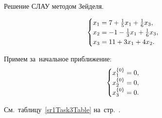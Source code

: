 \documentclass[10pt, a4paper, titlepage]{article}
\begin{document}
Решение СЛАУ методом Зейделя.

\begin{equation*}
    \begin{cases}
        $$x_1=7+\frac{1}{5}x_1+\frac{1}{6}x_3$$, \\
        $$x_2=-1-\frac{1}{3}x_1+\frac{1}{6}x_3$$, \\
        $$x_3=11+3x_1+4x_2$$.
    \end{cases}
\end{equation*}

Примем за~начальное приближение:
\begin{equation*}
    \begin{cases}
        $$x_1^{\{0\}}=0$$, \\
        $$x_2^{\{0\}}=0$$, \\
        $$x_3^{\{0\}}=0$$.
    \end{cases}
\end{equation*}

См.~таблицу~\ref{sr1Task3Table} на~стр.~\pageref{sr1Task3Table}.
\end{document}
